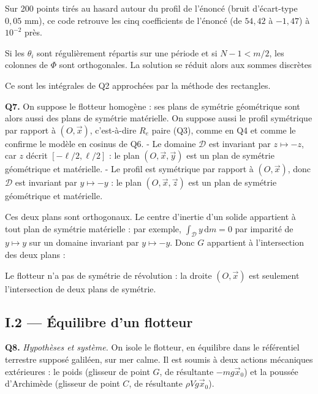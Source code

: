 \documentclass[11pt,a4paper]{article}
\newcommand{\equationajustee}[1]{%
  \sbox{\boiteequation}{$\displaystyle #1$}%
  \ifdim\wd\boiteequation>\linewidth
    \[\resizebox{\linewidth}{!}{\usebox{\boiteequation}}\]%
  \else
    \[#1\]%
  \fi}
\begin{document}
Sur 200 points tirés au hasard autour du profil de l'énoncé (bruit d'écart-type \(0{,}05\) mm), ce code retrouve les cinq coefficients de l'énoncé (de \(54{,}42\) à \(-1{,}47\)) à \(10^{-2}\) près.

Si les \(\theta_i\) sont régulièrement répartis sur une période et si \(N-1<m/2\), les colonnes de \(\Phi\) sont orthogonales. La solution se réduit alors aux sommes discrètes

\equationajustee{\begin{aligned}
a_0&=\frac1m\sum_{i=1}^m r_i\\
a_k&=\frac2m\sum_{i=1}^m r_i\cos(k\theta_i)
\end{aligned}}

Ce sont les intégrales de Q2 approchées par la méthode des rectangles.

\textbf{Q7.} On suppose le flotteur homogène : ses plans de symétrie géométrique sont alors aussi des plans de symétrie matérielle. On suppose aussi le profil symétrique par rapport à \((O,\vec x)\), c'est-à-dire \(R_e\) paire (Q3), comme en Q4 et comme le confirme le modèle en cosinus de Q6.
- Le domaine \(\mathcal D\) est invariant par \(z\mapsto-z\), car \(z\) décrit \([-\ell/2,\ell/2]\) : le plan \((O,\vec x,\vec y)\) est un plan de symétrie géométrique et matérielle.
- Le profil est symétrique par rapport à \((O,\vec x)\), donc \(\mathcal D\) est invariant par \(y\mapsto-y\) : le plan \((O,\vec x,\vec z)\) est un plan de symétrie géométrique et matérielle.

Ces deux plans sont orthogonaux. Le centre d'inertie d'un solide appartient à tout plan de symétrie matérielle : par exemple, \(\int_{\mathcal D}y\,\mathrm dm=0\) par imparité de \(y\mapsto y\) sur un domaine invariant par \(y\mapsto-y\). Donc \(G\) appartient à l'intersection des deux plans :

\equationajustee{\boxed{G\in(O,\vec x)}}

Le flotteur n'a pas de symétrie de révolution : la droite \((O,\vec x)\) est seulement l'intersection de deux plans de symétrie.

\hypertarget{i.2-uxe9quilibre-dun-flotteur}{%
\subsection{I.2 --- Équilibre d'un flotteur}\label{i.2-uxe9quilibre-dun-flotteur}}

\textbf{Q8.} \emph{Hypothèses et système.} On isole le flotteur, en équilibre dans le référentiel terrestre supposé galiléen, sur mer calme. Il est soumis à deux actions mécaniques extérieures : le poids (glisseur de point \(G\), de résultante \(-mg\vec x_0\)) et la poussée d'Archimède (glisseur de point \(C\), de résultante \(\rho Vg\vec x_0\)).
\end{document}
